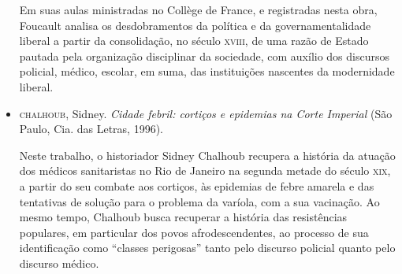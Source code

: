 \documentclass[12pt]{extarticle}
\begin{document}
\begin{itemize}
Em suas
aulas ministradas no Collège de France, e registradas nesta obra,
Foucault analisa os desdobramentos da política e da governamentalidade
liberal a partir da consolidação, no século \textsc{xviii}, de uma razão de
Estado pautada pela organização disciplinar da sociedade, com auxílio
dos discursos policial, médico, escolar, em suma, das instituições
nascentes da modernidade liberal.

\item \textsc{chalhoub}, Sidney. \emph{Cidade febril: cortiços e epidemias na Corte
Imperial} (São Paulo, Cia. das Letras, 1996). 

Neste trabalho, o
historiador Sidney Chalhoub recupera a história da atuação dos médicos
sanitaristas no Rio de Janeiro na segunda metade do século \textsc{xix}, a partir
do seu combate aos cortiços, às epidemias de febre amarela e das
tentativas de solução para o problema da varíola, com a sua vacinação.
Ao mesmo tempo, Chalhoub busca recuperar a história das resistências
populares, em particular dos povos afrodescendentes, ao processo de sua
identificação como ``classes perigosas'' tanto pelo discurso policial
quanto pelo discurso médico.
\end{itemize}
\end{document}
